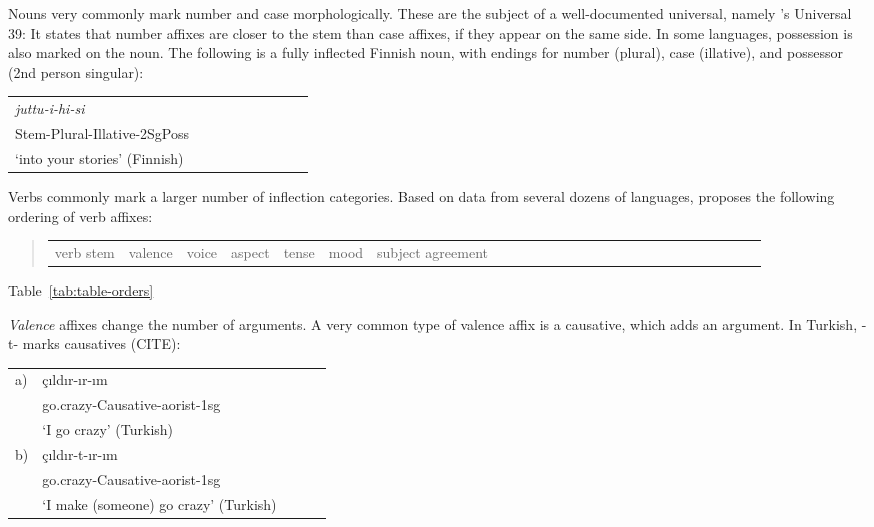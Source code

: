 \documentclass[11pt,letterpaper]{article}
\begin{document}
Nouns very commonly mark number and case morphologically.
These are the subject of a well-documented universal, namely \citep[112]{greenberg1963universals}'s Universal 39:
It states that number affixes are closer to the stem than case affixes, if they appear on the same side.
In some languages, possession is also marked on the noun.
The following is a fully inflected Finnish noun, with endings for number (plural), case (illative), and possessor (2nd person singular):


\begin{tabular}{lllllllll}
\textit{juttu-i-hi-si} \\
Stem-Plural-Illative-2SgPoss \\
`into your stories' (Finnish)
\end{tabular}

Verbs commonly mark a larger number of inflection categories.
Based on data from several dozens of languages, \citep{bybee-morphology-1985} proposes the following ordering of verb affixes:
\begin{quote}
\begin{tabular}{llllllllllllllllllllllllll}
verb stem & valence & voice & aspect & tense& mood & subject agreement
\end{tabular}
\end{quote}

 Table~\ref{tab:table-orders}

\textit{Valence} affixes change the number of arguments. A very common type of valence affix is a causative, which adds an argument. In Turkish, -t- marks causatives (CITE):

\begin{tabular}{lllll}
a) & çıldır-ır-ım \\
& go.crazy-Causative-aorist-1sg \\
& `I go crazy' (Turkish)\\
b) & çıldır-t-ır-ım \\
& go.crazy-Causative-aorist-1sg \\
& `I make (someone) go crazy' (Turkish) \\
\end{tabular}
\end{document}
